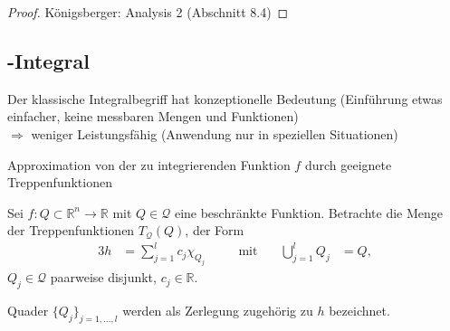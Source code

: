 \begin{proof}
	Königsberger: Analysis 2 (Abschnitt 8.4)
\end{proof}

\subsection{-Integral}
Der klassische Integralbegriff hat konzeptionelle Bedeutung (Einführung etwas einfacher, keine messbaren Mengen und Funktionen) \\
$\Rightarrow$ weniger Leistungsfähig (Anwendung nur in speziellen Situationen)

\begin{boldenvironment}[ebenfalls]
	Approximation von der zu integrierenden Funktion $f$ durch geeignete Treppenfunktionen
	
	Sei $f:Q\subset\mathbb{R}^n\to\mathbb{R}$ mit $Q\in\mathcal{Q}$ eine beschränkte Funktion. Betrachte die Menge der Treppenfunktionen $T_{\mathcal{Q}}(Q)$, der Form \begin{alignat*}{3}
		h &= \sum_{j=1}^l c_j \chi_{Q_j} & &\quad\text{mit}\quad & \bigcup_{j=1}^l Q_j&= Q,
	\end{alignat*}
	$Q_j\in\mathcal{Q}$ paarweise disjunkt, $c_j\in \mathbb{R}$.
	
	Quader $\{ Q_j\}_{j=1,\dotsc,l}$ werden als Zerlegung zugehörig zu $h$ bezeichnet.
\end{boldenvironment}

